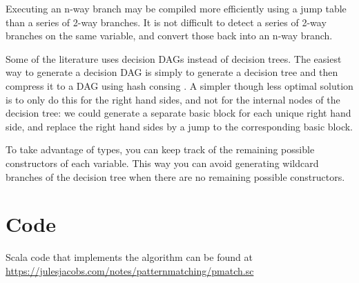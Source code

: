 \documentclass[a4paper, 11pt]{article}
\theoremstyle{definition}
\begin{document}
Executing an n-way branch may be compiled more efficiently using a jump table than a series of 2-way branches. It is not difficult to detect a series of 2-way branches on the same variable, and convert those back into an n-way branch.

Some of the literature uses decision DAGs instead of decision trees. The easiest way to generate a decision DAG is simply to generate a decision tree and then compress it to a DAG using hash consing \cite{maranget_compiling_2008}. A simpler though less optimal solution is to only do this for the right hand sides, and not for the internal nodes of the decision tree: we could generate a separate basic block for each unique right hand side, and replace the right hand sides by a jump to the corresponding basic block.

To take advantage of types, you can keep track of the remaining possible constructors of each variable. This way you can avoid generating wildcard branches of the decision tree when there are no remaining possible constructors.

\section{Code}

Scala code that implements the algorithm can be found at \\ \url{https://julesjacobs.com/notes/patternmatching/pmatch.sc}

\nocite{*}


\end{document}
